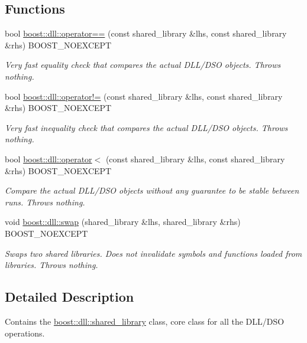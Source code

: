 \subsection*{Functions}
\begin{DoxyCompactItemize}
\item 
\mbox{\label{a00269_ad7233544269202b94686d41bea52d0ac}} 
bool \hyperlink{a00269_ad7233544269202b94686d41bea52d0ac}{boost\+::dll\+::operator==} (const shared\+\_\+library \&lhs, const shared\+\_\+library \&rhs) B\+O\+O\+S\+T\+\_\+\+N\+O\+E\+X\+C\+E\+PT
\begin{DoxyCompactList}\small\item\em Very fast equality check that compares the actual D\+L\+L/\+D\+SO objects. Throws nothing. \end{DoxyCompactList}\item 
\mbox{\label{a00269_aa9ae3e7be3360300ed88c56f9768a398}} 
bool \hyperlink{a00269_aa9ae3e7be3360300ed88c56f9768a398}{boost\+::dll\+::operator!=} (const shared\+\_\+library \&lhs, const shared\+\_\+library \&rhs) B\+O\+O\+S\+T\+\_\+\+N\+O\+E\+X\+C\+E\+PT
\begin{DoxyCompactList}\small\item\em Very fast inequality check that compares the actual D\+L\+L/\+D\+SO objects. Throws nothing. \end{DoxyCompactList}\item 
\mbox{\label{a00269_a623bee5ffa66c763e20d2333fa4e21a9}} 
bool \hyperlink{a00269_a623bee5ffa66c763e20d2333fa4e21a9}{boost\+::dll\+::operator$<$} (const shared\+\_\+library \&lhs, const shared\+\_\+library \&rhs) B\+O\+O\+S\+T\+\_\+\+N\+O\+E\+X\+C\+E\+PT
\begin{DoxyCompactList}\small\item\em Compare the actual D\+L\+L/\+D\+SO objects without any guarantee to be stable between runs. Throws nothing. \end{DoxyCompactList}\item 
\mbox{\label{a00269_aa1a3e7ddd810a581916551d8275c5e3f}} 
void \hyperlink{a00269_aa1a3e7ddd810a581916551d8275c5e3f}{boost\+::dll\+::swap} (shared\+\_\+library \&lhs, shared\+\_\+library \&rhs) B\+O\+O\+S\+T\+\_\+\+N\+O\+E\+X\+C\+E\+PT
\begin{DoxyCompactList}\small\item\em Swaps two shared libraries. Does not invalidate symbols and functions loaded from libraries. Throws nothing. \end{DoxyCompactList}\end{DoxyCompactItemize}


\subsection{Detailed Description}
Contains the \hyperlink{a01708}{boost\+::dll\+::shared\+\_\+library} class, core class for all the D\+L\+L/\+D\+SO operations. 

